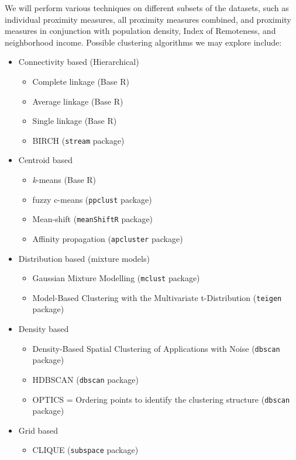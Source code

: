 \documentclass[11pt, a4paper]{article}
\begin{document}
We will perform various techniques on different subsets of the datasets, such as individual proximity measures, all proximity measures combined, and proximity measures in conjunction with population density, Index of Remoteness, and neighborhood income. Possible clustering algorithms we may explore include:

\begin{itemize}
\item Connectivity based (Hierarchical) 
\begin{itemize}
	\item Complete linkage (Base R)
	\item Average linkage (Base R)
	\item Single linkage (Base R)
	\item BIRCH (\texttt{stream} package)
\end{itemize}
\item Centroid based
\begin{itemize}
	\item \textit{k}-means (Base R)
	\item fuzzy c-means (\texttt{ppclust} package)
   	\item Mean-shift (\texttt{meanShiftR} package)
   	\item Affinity propagation (\texttt{apcluster} package)
\end{itemize}
\item Distribution based (mixture models)
\begin{itemize}
	\item Gaussian Mixture Modelling (\texttt{mclust} package)
   	\item Model-Based Clustering with the Multivariate t-Distribution (\texttt{teigen} package)
\end{itemize}
\item Density based
\begin{itemize}
	\item Density-Based Spatial Clustering of Applications with Noise (\texttt{dbscan} package)
	\item HDBSCAN (\texttt{dbscan} package) 
	\item OPTICS = Ordering points to identify the clustering structure (\texttt{dbscan} package) 
\end{itemize}
\item Grid based
\begin{itemize}
	\item CLIQUE (\texttt{subspace} package)
\end{itemize}
\end{itemize}
\end{document}
